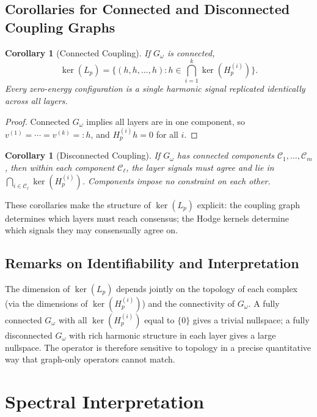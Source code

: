 \documentclass[11pt]{article}
\newtheorem{corollary}[theorem]{Corollary}
\theoremstyle{definition}
\theoremstyle{remark}
\newcommand{\Gom}{G_\omega}
\begin{document}
\subsection{Corollaries for Connected and Disconnected Coupling Graphs}

\begin{corollary}[Connected Coupling]
\label{cor:connected}
If $\Gom$ is connected,
\[
  \ker(L_p) = \bigl\{(h,h,\dots,h) : h\in\textstyle\bigcap_{i=1}^k\ker(H_p^{(i)})\bigr\}.
\]
Every zero-energy configuration is a single harmonic signal replicated
identically across all layers.
\end{corollary}

\begin{proof}
Connected $\Gom$ implies all layers are in one component, so $v^{(1)}=\cdots=
v^{(k)}=:h$, and $H_p^{(i)}h=0$ for all $i$.
\end{proof}

\begin{corollary}[Disconnected Coupling]
\label{cor:disconnected}
If $\Gom$ has connected components $\mathcal{C}_1,\dots,\mathcal{C}_m$, then
within each component $\mathcal{C}_\ell$, the layer signals must agree and lie
in $\bigcap_{i\in\mathcal{C}_\ell}\ker(H_p^{(i)})$. Components impose no
constraint on each other.
\end{corollary}

These corollaries make the structure of $\ker(L_p)$ explicit: the coupling graph
determines which layers must reach consensus; the Hodge kernels determine which
signals they may consensually agree on.

\subsection{Remarks on Identifiability and Interpretation}

The dimension of $\ker(L_p)$ depends jointly on the topology of each complex
(via the dimensions of $\ker(H_p^{(i)})$) and the connectivity of $\Gom$. A
fully connected $\Gom$ with all $\ker(H_p^{(i)})$ equal to $\{0\}$ gives a
trivial nullspace; a fully disconnected $\Gom$ with rich harmonic structure in
each layer gives a large nullspace. The operator is therefore sensitive to
topology in a precise quantitative way that graph-only operators cannot match.


\section{Spectral Interpretation}
\label{sec:spectral}
\end{document}
